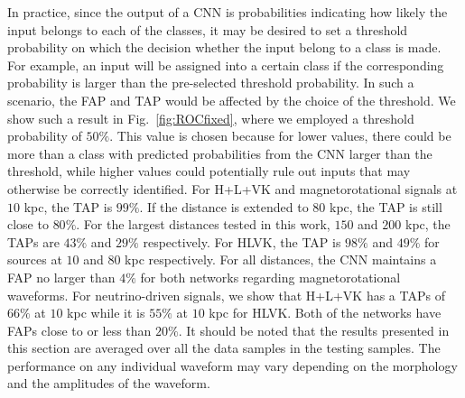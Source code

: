 \documentclass[aps,twocolumn,showpacs,groupedaddress, nofootinbib]{revtex4}  %
\begin{document}
In practice, since the output of a \ac{CNN} is probabilities indicating how
likely the input belongs to each of the classes, it may be desired to set a
threshold probability on which the decision whether the input belong to a class is made.
For example, an input will be assigned into a certain class if the
corresponding probability is larger than the pre-selected threshold probability. In such a
scenario, the \ac{FAP} and \ac{TAP} would be affected by the choice of the
threshold. We show such a result in Fig.~\ref{fig:ROCfixed}, where we employed
a threshold probability of $50\%$. This value is chosen because for lower values, 
there could be more than a class with predicted probabilities from the \ac{CNN} 
larger than the threshold, while higher values could potentially rule out inputs 
that may otherwise be correctly identified.
For H+L+VK and magnetorotational signals at $10$ kpc, the \ac{TAP} is $99\%$. If the distance
is extended to $80$ kpc, the \ac{TAP} is still close to $80\%$.  For the
largest distances tested in this work, $150$ and $200$ kpc, the \acp{TAP} are
$43\%$ and $29\%$ respectively. 
For HLVK, the \ac{TAP} is $98\%$ and $49\%$ for sources at $10$ and
$80$ kpc respectively.
For all distances, the \ac{CNN} maintains a \ac{FAP} no larger than $4\%$ for
both networks regarding magnetorotational waveforms. For neutrino-driven
signals, we show that H+L+VK has a \acp{TAP} of $66\%$ at $10$ kpc while it
is $55\%$ at $10$ kpc for HLVK.  Both of the networks have \acp{FAP} close to
or less than $20\%$. It should be noted that the results presented in this section are
averaged over all the data samples in the testing samples. The performance on
any individual waveform may vary depending on the morphology and the amplitudes
of the waveform.


\end{document}
